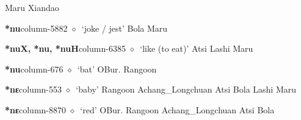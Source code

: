 \hspace{1ex}
         Maru 
\hspace{1ex}
         Xiandao 
  \item {\footnotesize \textbf{*nu}}{\tiny column-5882}
         $\diamond$~`joke / jest'
         Bola 
\hspace{1ex}
         Maru 
  \item {\footnotesize \textbf{*nuX, *nu, *nuH}}{\tiny column-6385}
         $\diamond$~`like (to eat)'
         Atsi 
\hspace{1ex}
         Lashi 
\hspace{1ex}
         Maru 
  \item {\footnotesize \textbf{*nu}}{\tiny column-676}
         $\diamond$~`bat'
         OBur. 
\hspace{1ex}
         Rangoon 
  \item {\footnotesize \textbf{*nɛ}}{\tiny column-553}
         $\diamond$~`baby'
         Rangoon 
\hspace{1ex}
         Achang\_Longchuan 
\hspace{1ex}
         Atsi 
\hspace{1ex}
         Bola 
\hspace{1ex}
         Lashi 
\hspace{1ex}
         Maru 
  \item {\footnotesize \textbf{*nɛ}}{\tiny column-8870}
         $\diamond$~`red'
         OBur. 
\hspace{1ex}
         Rangoon 
\hspace{1ex}
         Achang\_Longchuan 
\hspace{1ex}
         Atsi 
\hspace{1ex}
         Bola 
\hspace{1ex}
